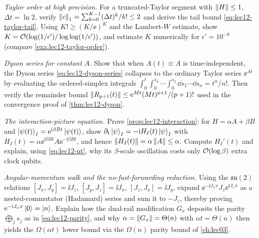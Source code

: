 \begin{exercise}\label{ex:lec12-4}
\emph{Taylor order at high precision.} For a truncated-Taylor segment with $\left\lVert H \right\rVert\le1$,
$\Delta t=\ln2$, verify $\left\lVert c \right\rVert_1=\sum_{k=0}^{K-1}(\Delta t)^k/k!\le2$ and derive the tail
bound \eqref{eq:lec12-taylor-tail}. Using $K!\ge(K/\ee)^K$ and the Lambert-$W$ estimate,
show $K=\mathcal{O}(\log(1/\epsilon')/\log\log(1/\epsilon'))$, and estimate $K$ numerically for
$\epsilon'=10^{-8}$ (compare \cref{exa:lec12-taylor-order}).
\end{exercise}

\begin{exercise}\label{ex:lec12-5}
\emph{Dyson series for constant $A$.} Show that when $A(t)\equiv A$ is time-independent, the
Dyson series \eqref{eq:lec12-dyson-series} collapses to the ordinary Taylor series
$\ee^{At}$ by evaluating the ordered-simplex integrals
$\int_0^t\!\int_0^{s_n}\!\cdots\int_0^{s_2}\dd s_1\cdots\dd s_n=t^n/n!$. Then verify the
remainder bound $\left\lVert R_{p+1}(t) \right\rVert\le\mathrm{e}^{Mt}(Mt)^{p+1}/(p+1)!$ used in the convergence
proof of \cref{thm:lec12-dyson}.
\end{exercise}

\begin{exercise}\label{ex:lec12-6}
\emph{The interaction-picture equation.} Prove \cref{prop:lec12-interaction}: for
$H=\alpha A+\beta B$ and $\ket{\psi(t)}_I=\mathrm{e}^{\mathrm{i}\beta Bt}\ket{\psi(t)}$, show
$\partial_t\ket{\psi}_I=-\mathrm{i} H_I(t)\ket{\psi}_I$ with
$H_I(t)=\alpha\ee^{\ii\beta Bt}A\ee^{-\ii\beta Bt}$, and hence $\left\lVert H_I(t) \right\rVert=\alpha\left\lVert A \right\rVert\le\alpha$. Compute $H_I'(t)$ and explain, using \eqref{eq:lec12-nt}, why its
$\beta$-scale oscillation costs only $\mathcal{O}(\log\beta)$ extra clock qubits.
\end{exercise}

\begin{exercise}\label{ex:lec12-7}
\emph{Angular-momentum walk and the no-fast-forwarding reduction.} Using the
$\mathfrak{su}(2)$ relations $[J_x,J_y]=\ii J_z$, $[J_y,J_z]=\ii J_x$, $[J_z,J_x]=\ii J_y$,
expand $\ee^{-\ii J_x\pi}J_z\ee^{\ii J_x\pi}$ as a nested-commutator (Hadamard) series and
sum it to $-J_z$, thereby proving $\mathrm{e}^{-\mathrm{i} J_x\pi}\ket0=\ket n$. Explain how the dual-rail
modification $G_x$ deposits the parity $\bigoplus_j s_j$ as in \eqref{eq:lec12-parity}, and
why $\alpha=\left\lVert G_x \right\rVert=\Theta(n)$ with $\alpha t=\Theta(n)$ then yields the $\Omega(\alpha
t)$ lower bound via the $\Omega(n)$ parity bound of \cref{ch:lec03}.
\end{exercise}

